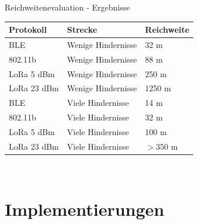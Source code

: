 \documentclass[18pt]{beamer}
\begin{document}
\begin{frame}{Reichweitenevaluation - Ergebnisse}
	\centering
	\begin{tabular}{l|l|l}
		Protokoll & Strecke & Reichweite \\
		\hline
		BLE & Wenige Hindernisse & 32 m \\
		802.11b & Wenige Hindernisse & 88 m \\
		LoRa 5 dBm & Wenige Hindernisse & 250 m \\
		LoRa 23 dBm & Wenige Hindernisse & 1250 m \\
		\hline
		\pause
		BLE & Viele Hindernisse & 14 m \\
		802.11b & Viele Hindernisse & 32 m \\
		LoRa 5 dBm & Viele Hindernisse & 100 m \\
		LoRa 23 dBm & Viele Hindernisse & $>$350 m \\
	\end{tabular}\\
\end{frame}

\section{Implementierungen}
\end{document}
